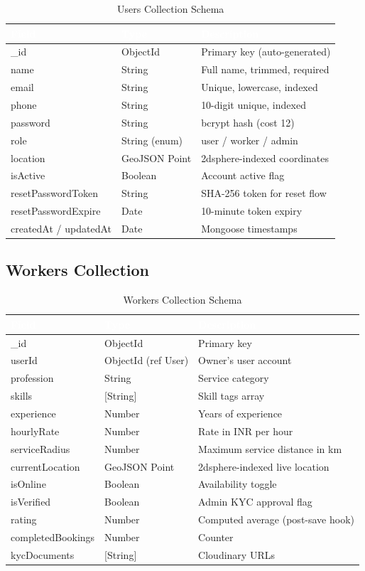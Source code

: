 \documentclass[12pt,a4paper]{report}
\newcommand{\thead}[1]{\cellcolor{tableheader}\textcolor{white}{\textbf{#1}}}
\begin{document}
\begin{table}[h!]
\centering
\caption{Users Collection Schema}
\renewcommand{\arraystretch}{1.3}
\begin{tabular}{|p{3.5cm}|p{2.5cm}|p{7cm}|}
\hline
\thead{Field} & \thead{Type} & \thead{Description} \\
\hline
\_id & ObjectId & Primary key (auto-generated) \\
name & String & Full name, trimmed, required \\
email & String & Unique, lowercase, indexed \\
phone & String & 10-digit unique, indexed \\
password & String & bcrypt hash (cost 12) \\
role & String (enum) & user / worker / admin \\
location & GeoJSON Point & 2dsphere-indexed coordinates \\
isActive & Boolean & Account active flag \\
resetPasswordToken & String & SHA-256 token for reset flow \\
resetPasswordExpire & Date & 10-minute token expiry \\
createdAt / updatedAt & Date & Mongoose timestamps \\
\hline
\end{tabular}
\end{table}

\subsection{Workers Collection}

\begin{table}[h!]
\centering
\caption{Workers Collection Schema}
\renewcommand{\arraystretch}{1.3}
\begin{tabular}{|p{3.5cm}|p{2.5cm}|p{7cm}|}
\hline
\thead{Field} & \thead{Type} & \thead{Description} \\
\hline
\_id & ObjectId & Primary key \\
userId & ObjectId (ref User) & Owner's user account \\
profession & String & Service category \\
skills & [String] & Skill tags array \\
experience & Number & Years of experience \\
hourlyRate & Number & Rate in INR per hour \\
serviceRadius & Number & Maximum service distance in km \\
currentLocation & GeoJSON Point & 2dsphere-indexed live location \\
isOnline & Boolean & Availability toggle \\
isVerified & Boolean & Admin KYC approval flag \\
rating & Number & Computed average (post-save hook) \\
completedBookings & Number & Counter \\
kycDocuments & [String] & Cloudinary URLs \\
\hline
\end{tabular}
\end{table}
\end{document}
